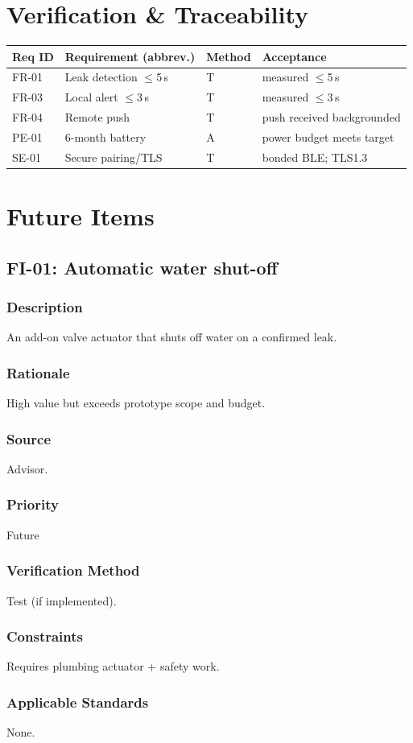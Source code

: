\documentclass[11pt,letterpaper]{article}
\newcommand{\req}[7]{\subsubsection*{Description} #1 \subsubsection*{Rationale} #2
  \subsubsection*{Source} #3 \subsubsection*{Priority} #4
  \subsubsection*{Verification Method} #5 \subsubsection*{Constraints} #6
  \subsubsection*{Applicable Standards} #7}
\begin{document}
\section{Verification \& Traceability}
\begin{longtable}{ | p{1.4cm} | p{6.6cm} | p{1.4cm} | p{3cm} |}\hline
\textbf{Req ID} & \textbf{Requirement (abbrev.)} & \textbf{Method} & \textbf{Acceptance} \\ \hline\endhead
FR-01 & Leak detection $\leq$5\,s & T & measured $\leq$5\,s \\ \hline
FR-03 & Local alert $\leq$3\,s & T & measured $\leq$3\,s \\ \hline
FR-04 & Remote push & T & push received backgrounded \\ \hline
PE-01 & 6-month battery & A & power budget meets target \\ \hline
SE-01 & Secure pairing/TLS & T & bonded BLE; TLS1.3 \\ \hline
\end{longtable}

\section{Future Items}
\subsection{FI-01: Automatic water shut-off}
\req{An add-on valve actuator that shuts off water on a confirmed leak.}
{High value but exceeds prototype scope and budget.}
{Advisor.}{Future}{Test (if implemented).}{Requires plumbing actuator + safety work.}{None.}


{}
\end{document}

